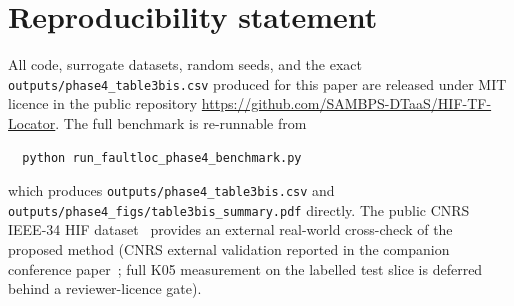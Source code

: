 \documentclass[journal]{IEEEtran}
\begin{document}
\section{Reproducibility statement}\label{sec:reproducibility}
All code, surrogate datasets, random seeds, and the exact
\texttt{outputs/phase4\_table3bis.csv} produced for this paper are
released under MIT licence in the public repository
\url{https://github.com/SAMBPS-DTaaS/HIF-TF-Locator}.  The full
benchmark is re-runnable from
\begin{verbatim}
  python run_faultloc_phase4_benchmark.py
\end{verbatim}
which produces \texttt{outputs/phase4\_table3bis.csv} and
\texttt{outputs/phase4\_figs/table3bis\_summary.pdf} directly.  The
public CNRS IEEE-34 HIF dataset~\cite{CNRS_2024_IEEE34} provides
an external real-world cross-check of the proposed method (CNRS
external validation reported in the companion conference
paper~\cite{Phase3conf2027}; full K05 measurement on the labelled
test slice is deferred behind a reviewer-licence gate).



\end{document}
